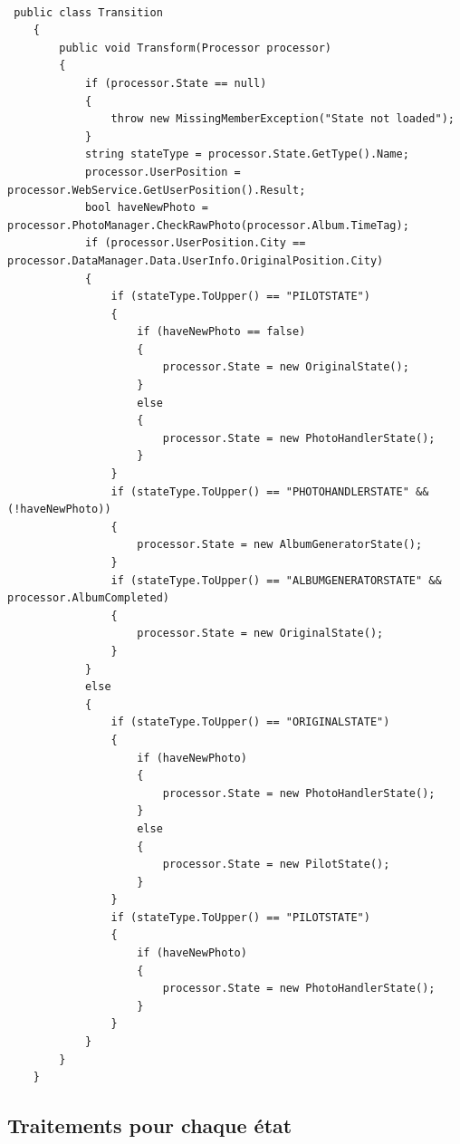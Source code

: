 \documentclass{article}
\begin{document}
\begin{lstlisting}[label=Transition entre les états,caption=Transition entre les états]

 public class Transition
    {
        public void Transform(Processor processor)
        {
            if (processor.State == null)
            {
                throw new MissingMemberException("State not loaded");
            }
            string stateType = processor.State.GetType().Name;
            processor.UserPosition = processor.WebService.GetUserPosition().Result;
            bool haveNewPhoto = processor.PhotoManager.CheckRawPhoto(processor.Album.TimeTag);
            if (processor.UserPosition.City == processor.DataManager.Data.UserInfo.OriginalPosition.City)
            {
                if (stateType.ToUpper() == "PILOTSTATE")
                {
                    if (haveNewPhoto == false)
                    {
                        processor.State = new OriginalState();
                    }
                    else
                    {
                        processor.State = new PhotoHandlerState();
                    }
                }
                if (stateType.ToUpper() == "PHOTOHANDLERSTATE" && (!haveNewPhoto))
                {
                    processor.State = new AlbumGeneratorState();
                }
                if (stateType.ToUpper() == "ALBUMGENERATORSTATE" && processor.AlbumCompleted)
                {
                    processor.State = new OriginalState();
                }
            }
            else
            {
                if (stateType.ToUpper() == "ORIGINALSTATE")
                {
                    if (haveNewPhoto)
                    {
                        processor.State = new PhotoHandlerState();
                    }
                    else
                    {
                        processor.State = new PilotState();
                    }
                }
                if (stateType.ToUpper() == "PILOTSTATE")
                {
                    if (haveNewPhoto)
                    {
                        processor.State = new PhotoHandlerState();
                    }
                }
            }
        }
    }
\end{lstlisting}

\vspace{0.2 cm}
\subsection{\Large Traitements pour chaque état}
\end{document}
